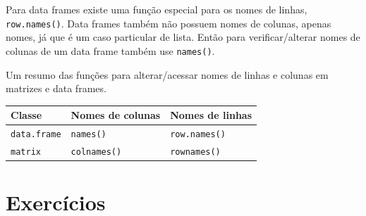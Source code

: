 \documentclass[10pt,a4paper]{book}
\newenvironment{Shaded}{\begin{snugshade}}{\end{snugshade}}
\newcommand{\KeywordTok}[1]{\textcolor[rgb]{0.13,0.29,0.53}{\textbf{#1}}}
\newcommand{\DecValTok}[1]{\textcolor[rgb]{0.00,0.00,0.81}{#1}}
\newcommand{\StringTok}[1]{\textcolor[rgb]{0.31,0.60,0.02}{#1}}
\newcommand{\OperatorTok}[1]{\textcolor[rgb]{0.81,0.36,0.00}{\textbf{#1}}}
\newcommand{\NormalTok}[1]{#1}
\begin{document}
Para data frames existe uma função especial para os nomes de linhas,
\texttt{row.names()}. Data frames também não possuem nomes de colunas,
apenas nomes, já que é um caso particular de lista. Então para
verificar/alterar nomes de colunas de um data frame também use
\texttt{names()}.

\begin{Shaded}
\end{Shaded}

Um resumo das funções para alterar/acessar nomes de linhas e colunas em
matrizes e data frames.

\begin{longtable}[]{@{}lll@{}}
\toprule
Classe & Nomes de colunas & Nomes de linhas\tabularnewline
\midrule
\endhead
\texttt{data.frame} & \texttt{names()} &
\texttt{row.names()}\tabularnewline
\texttt{matrix} & \texttt{colnames()} &
\texttt{rownames()}\tabularnewline
\bottomrule
\end{longtable}

\section*{Exercícios}\label{exercicios-4}
\end{document}
